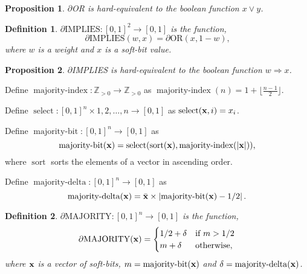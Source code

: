 \documentclass{article} %
\newtheorem*{definition}{Definition}
\newtheorem{prop}{Proposition}
\begin{document}
\begin{prop}\label{prop:or}
	$\partial${OR} is hard-equivalent to the boolean function $x \vee y$.
\end{prop}

\begin{definition}
$\partial\text{IMPLIES}: [0,1]^{2} \rightarrow [0,1]$ is the function,
	\begin{equation*}
	\partial\text{IMPLIES}(w, x) = \partial\text{OR}(x, 1-w)\text{,}
	\end{equation*}
where $w$ is a weight and $x$ is a soft-bit value.
\end{definition}

\begin{prop}\label{prop:implies}
	$\partial${IMPLIES} is hard-equivalent to the boolean function $w \Rightarrow x$.
\end{prop}

Define $\operatorname{majority-index}: \mathbb{Z}_{>0} \rightarrow \mathbb{Z}_{> 0}$ as $\operatorname{majority-index}(n) = 1 + \lfloor \frac{n-1}{2}\rfloor$.

Define $\operatorname{select}: [0,1]^n \times {1, 2, \ldots, n} \rightarrow [0,1]$ as  $\operatorname{select}({\bf x}, i) = x_{i}$.

Define $\operatorname{majority-bit}: [0,1]^n \rightarrow [0,1]$ as  $$\operatorname{majority-bit}({\bf x}) = \operatorname{select}( \operatorname{sort}({\bf x}), \operatorname{majority-index}(\lvert{\bf x}\rvert))\text{,}$$ where $\operatorname{sort}$ sorts the elements of a vector in ascending order.

Define $\operatorname{majority-delta}: [0,1]^n \rightarrow [0,1]$ as
$$\operatorname{majority-delta}({\bf x}) = \bar{\bf x} \times \left| \operatorname{majority-bit}({\bf x}) - 1/2\right|\text{.}$$

\begin{definition}
$\partial\text{MAJORITY}: [0,1]^{n} \rightarrow [0,1]$ is the function,
	\begin{equation*}
	\partial\text{MAJORITY}({\bf x}) = 
	\begin{cases}
	1/2 + \delta & \text{if } m > 1/2 \\
	m + \delta & \text{otherwise,}
	\end{cases}
	\end{equation*}
	where ${\bf x}$ is a vector of soft-bits, $m = \operatorname{majority-bit}({\bf x})$ and $\delta = \operatorname{majority-delta}({\bf x})$.
\end{definition}
\end{document}
